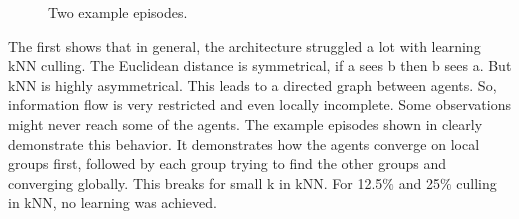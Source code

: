 \begin{figure}[htp]
    \centering
    \hspace{1cm}                       
    \caption{Two example episodes.}
    \label{fig:observation-examples}
\end{figure}

The first  shows that in general, the architecture struggled a lot with learning kNN culling. The Euclidean distance is symmetrical, if a sees b then b sees a. But kNN is highly asymmetrical. This leads to a directed graph between agents. So, information flow is very restricted and even locally incomplete. Some observations might never reach some of the agents. The example episodes shown in  clearly demonstrate this behavior. It demonstrates how the agents converge on local groups first, followed by each group trying to find the other groups and converging globally. This breaks for small k in kNN. For 12.5$\%$ and 25$\%$ culling in kNN, no learning was achieved.


